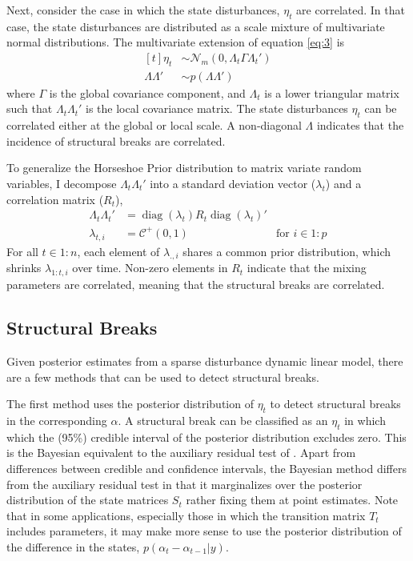\documentclass{article}
\newcommand{\dist}[1]{\mathcal{#1}}
\newcommand{\paren}[1]{\ensuremath{\left(#1\right)}}
\newcommand{\dmvnorm}[2]{\ensuremath{\dist{N}_{#2}\paren{#1}}}
\newcommand{\dhalfcauchy}[1]{\ensuremath{\dist{C}^{+}\paren{#1}}}
\DeclareMathOperator{\diag}{diag}
\begin{document}
Next, consider the case in which the state disturbances, $\eta_{t}$ are correlated.
In that case, the state disturbances are distributed as a scale mixture of multivariate normal distributions.
The multivariate extension of equation \eqref{eq:3} is
\begin{equation}
  \begin{aligned}[t]
    \eta_{t} &\sim \dmvnorm{0, \Lambda_{t} \Gamma \Lambda_{t}'}{m} \\
    \Lambda \Lambda' & \sim p(\Lambda \Lambda')
  \end{aligned}
\end{equation}
where $\Gamma$ is the global covariance component, and $\Lambda_{t}$ is a lower triangular matrix such that  $\Lambda_{t} \Lambda_{t}'$ is the local covariance matrix.
The state disturbances $\eta_{t}$ can be correlated either at the global or local scale.
A non-diagonal $\Lambda$ indicates that the incidence of structural breaks are correlated.

To generalize the Horseshoe Prior distribution to matrix variate random variables, I decompose $\Lambda_{t} \Lambda_{t}'$ into a standard deviation vector ($\lambda_{t}$) and a correlation matrix ($R_{t}$),%
\begin{align}
  \label{eq:16}
  \Lambda_{t} \Lambda_{t}' &= \diag(\lambda_{t}) R_{t} \diag(\lambda_{t})' \\
  \label{eq:17}
  \lambda_{t,i} &= \dhalfcauchy{0, 1} & \text{for $i \in 1:p$}
\end{align}
For all $t \in 1:n$, each element of $\lambda_{.,i}$ shares a common prior distribution, which shrinks $\lambda_{1:t,i}$ over time.
Non-zero elements in $R_{t}$ indicate that the mixing parameters are correlated, meaning that the structural breaks are correlated.

\subsection{Structural Breaks}

Given posterior estimates from a sparse disturbance dynamic linear model, there are a few methods that can be used to detect structural breaks.

The first method uses the posterior distribution of $\eta_{t}$ to detect structural breaks in the corresponding $\alpha$.
A structural break can be classified as an $\eta_{t}$ in which which the (95\%) credible interval of the posterior distribution excludes zero.
This is the Bayesian equivalent to the auxiliary residual test of \textcites{JongPenzer1998}{DurbinKoopman2001}.%
Apart from differences between credible and confidence intervals, the Bayesian method differs from the auxiliary residual test in that it marginalizes over the posterior distribution of the state matrices $S_{t}$ rather fixing them at point estimates.
Note that in some applications, especially those in which the transition matrix $T_{t}$ includes parameters, it may make more sense to use the posterior distribution of the difference in the states, $p(\alpha_{t} - \alpha_{t - 1} | y)$.
\end{document}
